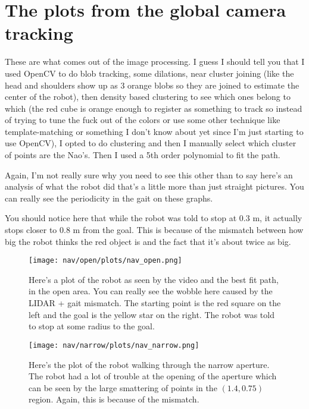 \section{The plots from the global camera tracking}
These are what comes out of the image processing.
I guess I should tell you that I used OpenCV to do blob tracking, some dilations, near cluster
joining (like the head and shoulders show up as 3 orange blobs so they are joined to estimate the
center of the robot), then density based clustering to see which ones belong to which (the red cube is
orange enough to register as something to track so instead of trying to tune the fuck out of the colors
or use some other technique like template-matching or something I don't know about yet since I'm just 
starting to use OpenCV), I opted to do clustering and then I manually select which cluster of points are
the Nao's. Then I used a 5th order polynomial to fit the path.

Again, I'm not really sure why you need to see this other than to say here's an analysis of 
what the robot did that's a little more than just straight pictures.
You can really see the periodicity in the gait on these graphs.

You should notice here that while the robot was told to stop at 0.3 m, it actually
stops closer to 0.8 m from the goal.
This is because of the mismatch between how big the robot thinks the red object is
and the fact that it's about twice as big.

\begin{figure}
  \texttt{[image: nav/open/plots/nav\_open.png]}
  \caption{Here's a plot of the robot as seen by the video and the best fit path, in the open area.
           You can really see the wobble here caused by the LIDAR + gait mismatch.
           The starting point is the red square on the left and the goal is the yellow star on the right.
           The robot was told to stop at some radius to the goal.}
  \label{fig:nav_open_plot1}
\end{figure}

\begin{figure}
  \texttt{[image: nav/narrow/plots/nav\_narrow.png]}
  \caption{Here's the plot of the robot walking through the narrow aperture.
           The robot had a lot of trouble at the opening of the aperture which can be seen by the
           large smattering of points in the $(1.4, 0.75)$ region. Again, this is because of
           the mismatch.}
  \label{fig:nav_narrow_plot1}
\end{figure}

